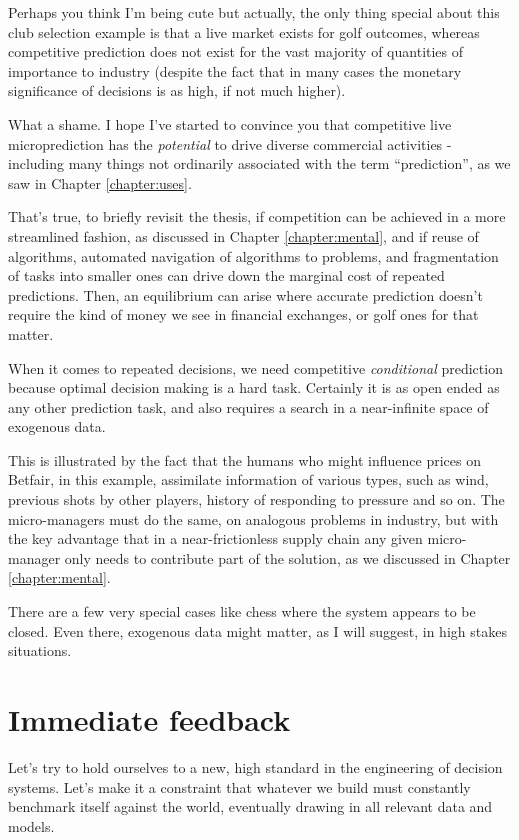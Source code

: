 Perhaps you think I'm being cute but actually, the only thing special about this club selection example is that a live market exists for golf outcomes, whereas competitive prediction does not exist for the vast majority of quantities of importance to industry (despite the fact that in many cases the monetary significance of decisions is as high, if not much higher).

What a shame. I hope I've started to convince you that competitive live microprediction has the {\em potential} to drive diverse commercial activities - including many things not ordinarily associated with the term ``prediction'', as we saw in Chapter \ref{chapter:uses}. 

That's true, to briefly revisit the thesis, if competition can be achieved in a more streamlined fashion, as discussed in Chapter \ref{chapter:mental}, and if reuse of algorithms, automated navigation of algorithms to problems, and fragmentation of tasks into smaller ones can drive down the marginal cost of repeated predictions. Then, an equilibrium can arise where accurate prediction doesn't require the kind of money we see in financial exchanges, or golf ones for that matter.   

When it comes to repeated decisions, we need competitive {\em conditional} prediction because optimal decision making is a hard task. Certainly it is as open ended as any other prediction task, and also requires a search in a near-infinite space of exogenous data. 

This is illustrated by the fact that the humans who might influence prices on Betfair, in this example, assimilate information of various types, such as wind, previous shots by other players, history of responding to pressure and so on. The micro-managers must do the same, on analogous problems in industry, but with the key advantage that in a near-frictionless supply chain any given micro-manager only needs to contribute part of the solution, as we discussed in Chapter \ref{chapter:mental}.     

There are a few very special cases like chess where the system appears to be closed. Even there, exogenous data might matter, as I will suggest, in high stakes situations. 

\section{Immediate feedback}

Let's try to hold ourselves to a new, high standard in the engineering of decision systems. Let's make it a constraint that whatever we build must constantly benchmark itself against the world, eventually drawing in all relevant data and models. 

